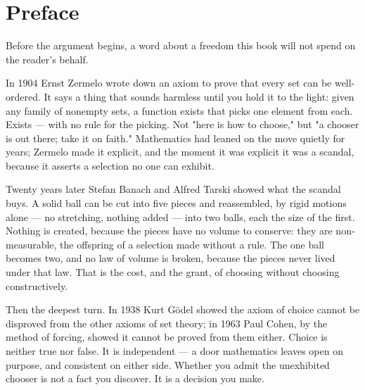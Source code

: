 \chapter*{Preface}

Before the argument begins, a word about a freedom this book will not spend on
the reader's behalf.

In 1904 Ernst Zermelo wrote down an axiom to prove that every set can be
well-ordered. It says a thing that sounds harmless until you hold it to the
light: given any family of nonempty sets, a function exists that picks one
element from each. Exists --- with no rule for the picking. Not "here is how to
choose," but "a chooser is out there; take it on faith." Mathematics had leaned
on the move quietly for years; Zermelo made it explicit, and the moment it was
explicit it was a scandal, because it asserts a selection no one can exhibit.

Twenty years later Stefan Banach and Alfred Tarski showed what the scandal buys.
A solid ball can be cut into five pieces and reassembled, by rigid motions alone
--- no stretching, nothing added --- into two balls, each the size of the first.
Nothing is created, because the pieces have no volume to conserve: they are
non-measurable, the offspring of a selection made without a rule. The one ball
becomes two, and no law of volume is broken, because the pieces never lived
under that law. That is the cost, and the grant, of choosing without choosing
constructively.

Then the deepest turn. In 1938 Kurt G\"odel showed the axiom of choice cannot be
disproved from the other axioms of set theory; in 1963 Paul Cohen, by the method
of forcing, showed it cannot be proved from them either. Choice is neither true
nor false. It is independent --- a door mathematics leaves open on purpose, and
consistent on either side. Whether you admit the unexhibited chooser is not a
fact you discover. It is a decision you make.

